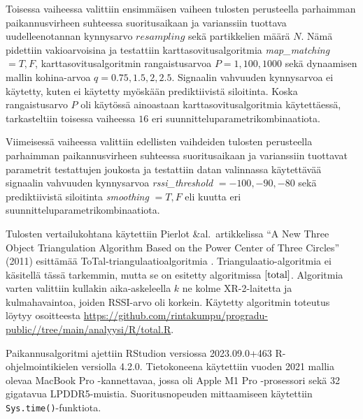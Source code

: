 \documentclass[
  12pt,
  a4paper, twoside]{book}
\begin{document}
Toisessa vaiheessa valittiin ensimmäisen vaiheen tulosten perusteella parhaimman paikannusvirheen suhteessa suoritusaikaan ja varianssiin tuottava uudelleenotannan kynnysarvo \(resampling\) sekä partikkelien määrä \(N\). Nämä pidettiin vakioarvoisina ja testattiin karttasovitusalgoritmia \emph{map\_matching} \(={T,F}\), karttasovitusalgoritmin rangaistusarvoa \(P={1,100,1000}\) sekä dynaamisen mallin kohina-arvoa \(q={0.75,1.5,2,2.5}\). Signaalin vahvuuden kynnysarvoa ei käytetty, kuten ei käytetty myöskään prediktiivistä siloitinta. Koska rangaistusarvo \(P\) oli käytössä ainoastaan karttasovitusalgoritmia käytettäessä, tarkasteltiin toisessa vaiheessa \(16\) eri suunnitteluparametrikombinaatiota.

Viimeisessä vaiheessa valittiin edellisten vaihdeiden tulosten perusteella parhaimman paikannusvirheen suhteessa suoritusaikaan ja varianssiin tuottavat parametrit testattujen joukosta ja testattiin datan valinnassa käytettävää signaalin vahvuuden kynnysarvoa \emph{rssi\_threshold} \(={-100,-90,-80}\) sekä prediktiivistä siloitinta \emph{smoothing} \(={T,F}\) eli kuutta eri suunnitteluparametrikombinaatiota.

Tulosten vertailukohtana käytettiin Pierlot \&al.~artikkelissa ``A New Three Object Triangulation Algorithm Based on the Power Center of Three Circles'' (2011) esittämää ToTal-triangulaatioalgoritmia \citep{Pierlot-2011}. Triangulaatio-algoritmia ei käsitellä tässä tarkemmin, mutta se on esitetty algoritmissa \(\ref{total}\). Algoritmia varten valittiin kullakin aika-askeleella \(k\) ne kolme XR-2-laitetta ja kulmahavaintoa, joiden RSSI-arvo oli korkein. Käytetty algoritmin toteutus löytyy osoitteesta \newline  \url{https://github.com/rintakumpu/progradu-public//tree/main/analyysi/R/total.R}.

Paikannusalgoritmi ajettiin RStudion versiossa 2023.09.0+463 R-ohjelmointikielen versiolla 4.2.0. Tietokoneena käytettiin vuoden 2021 mallia olevaa MacBook Pro -kannettavaa, jossa oli Apple M1 Pro -prosessori sekä 32 gigatavua LPDDR5-muistia. Suoritusnopeuden mittaamiseen käytettiin \texttt{Sys.time()}-funktiota.
\end{document}
